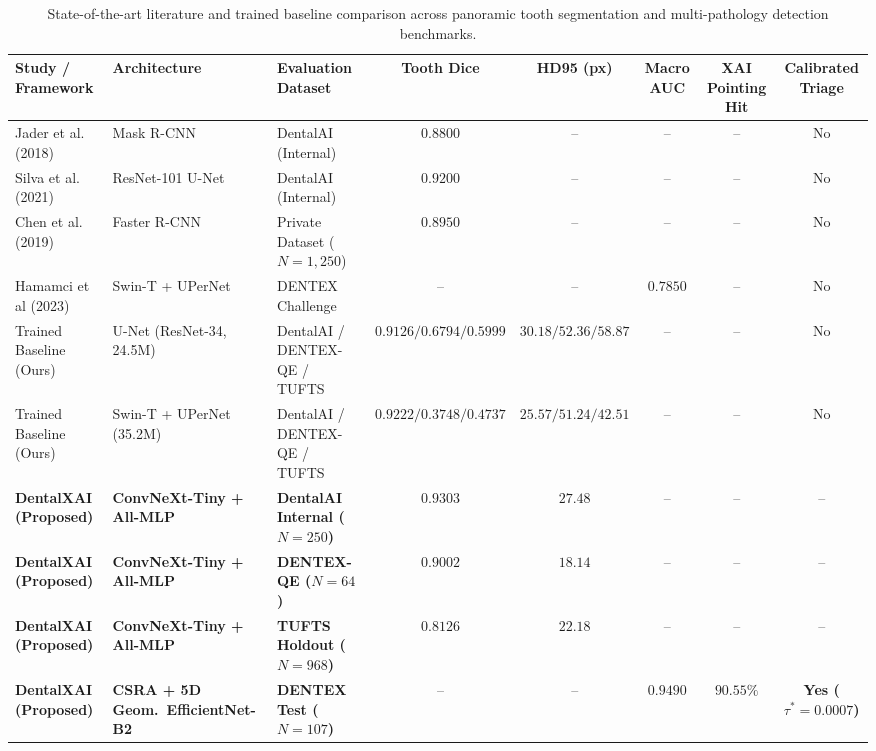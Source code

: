 \documentclass[review]{elsarticle}
\begin{document}
\begin{table}[t]
\centering
\caption{State-of-the-art literature and trained baseline comparison across panoramic tooth segmentation and multi-pathology detection benchmarks.}
\label{tab:sota}
\begin{adjustbox}{width=\textwidth}
\begin{tabular}{lllccccc}
\toprule
\textbf{Study / Framework} & \textbf{Architecture} & \textbf{Evaluation Dataset} & \textbf{Tooth Dice} & \textbf{HD95 (px)} & \textbf{Macro AUC} & \textbf{XAI Pointing Hit} & \textbf{Calibrated Triage} \\
\midrule
Jader et al. (2018)~\cite{jader2018deep} & Mask R-CNN & DentalAI (Internal) & $0.8800$ & -- & -- & -- & No \\
Silva et al. (2021)~\cite{silva2021automatic} & ResNet-101 U-Net & DentalAI (Internal) & $0.9200$ & -- & -- & -- & No \\
Chen et al. (2019)~\cite{chen2019tooth} & Faster R-CNN & Private Dataset ($N=1,250$) & $0.8950$ & -- & -- & -- & No \\
Hamamci et al (2023)~\cite{hamamci2023dentex} & Swin-T + UPerNet & DENTEX Challenge & -- & -- & $0.7850$ & -- & No \\
Trained Baseline (Ours) & U-Net (ResNet-34, 24.5M) & DentalAI / DENTEX-QE / TUFTS & $0.9126 / 0.6794 / 0.5999$ & $30.18 / 52.36 / 58.87$ & -- & -- & No \\
Trained Baseline (Ours) & Swin-T + UPerNet (35.2M) & DentalAI / DENTEX-QE / TUFTS & $0.9222 / 0.3748 / 0.4737$ & $25.57 / 51.24 / 42.51$ & -- & -- & No \\
\midrule
\textbf{DentalXAI (Proposed)} & \textbf{ConvNeXt-Tiny + All-MLP} & \textbf{DentalAI Internal ($N=250$)} & $\mathbf{0.9303}$ & $\mathbf{27.48}$ & -- & -- & -- \\
\textbf{DentalXAI (Proposed)} & \textbf{ConvNeXt-Tiny + All-MLP} & \textbf{DENTEX-QE ($N=64$)} & $\mathbf{0.9002}$ & $\mathbf{18.14}$ & -- & -- & -- \\
\textbf{DentalXAI (Proposed)} & \textbf{ConvNeXt-Tiny + All-MLP} & \textbf{TUFTS Holdout ($N=968$)} & $\mathbf{0.8126}$ & $\mathbf{22.18}$ & -- & -- & -- \\
\textbf{DentalXAI (Proposed)} & \textbf{CSRA + 5D Geom.\ EfficientNet-B2} & \textbf{DENTEX Test ($N=107$)} & -- & -- & $\mathbf{0.9490}$ & $\mathbf{90.55\%}$ & \textbf{Yes ($\tau^*=0.0007$)} \\
\bottomrule
\end{tabular}
\end{adjustbox}
\end{table}
\end{document}
